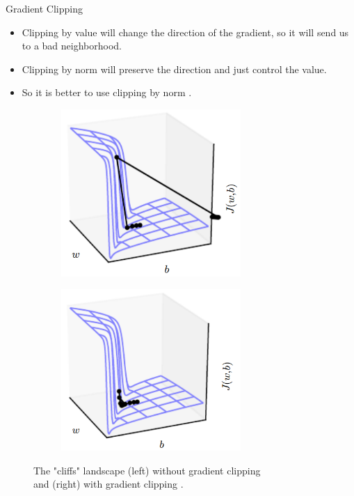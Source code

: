 \documentclass[compress,oilve,t]{beamer}
\newcommand{\tc}[2]{
	\textcolor{#1}{\hspace{-2pt}#2\hspace{-2pt}}
}
\begin{document}
\begin{frame}{Gradient Clipping}
	\begin{itemize}
		\item Clipping by \tc{keywords}{value} will \tc{keywords}{change the direction} of the gradient, so it will send us to a bad neighborhood.
		\item Clipping by \tc{keywords}{norm} will \tc{keywords}{preserve the direction} and just control the value.
		\item So it is better to use clipping by \tc{keywords}{norm}.
	\end{itemize}
	\begin{figure}[H]
		\centering
		\begin{subfigure}[b]{0.45\textwidth}
			\centering
			\includegraphics[width=0.75\textwidth]{Figs/gard-clipping-1.png}
		\end{subfigure}
		\begin{subfigure}[b]{0.45\textwidth}
			\centering
			\includegraphics[width=0.75\textwidth]{Figs/grad-clipping-2.png}
		\end{subfigure}
		\caption{The "cliffs" landscape (left) without gradient clipping\\ and (right) with gradient clipping \cite{Goodfellow-et-al-2016}.}
	\end{figure}
\end{frame}
\end{document}
